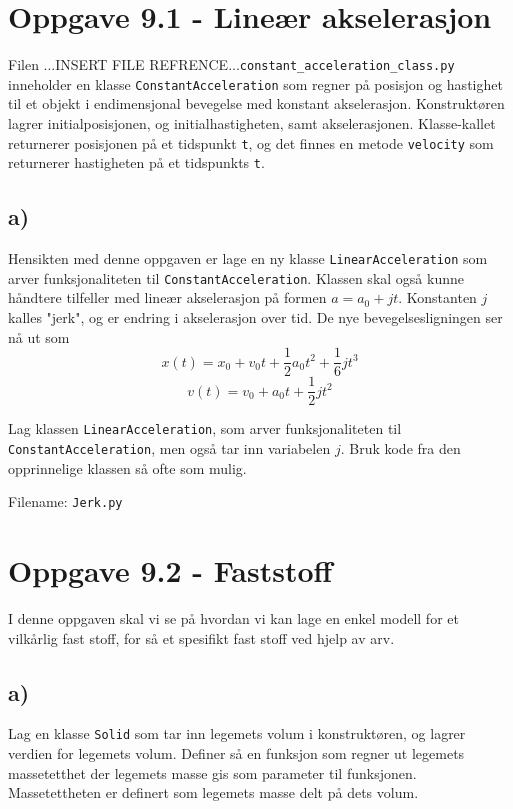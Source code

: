 \documentclass[10pt,a4paper]{article}
\newcommand{\half}{\frac{1}{2}}
\begin{document}
\section*{Oppgave 9.1 - Lineær akselerasjon}
Filen ...INSERT FILE REFRENCE...\texttt{constant\_acceleration\_class.py} inneholder en klasse \texttt{ConstantAcceleration} som regner på posisjon og hastighet til et objekt i endimensjonal bevegelse med konstant akselerasjon. Konstruktøren lagrer initialposisjonen, og initialhastigheten, samt akselerasjonen. Klasse-kallet returnerer posisjonen på et tidspunkt \texttt{t}, og det finnes en metode \texttt{velocity} som returnerer hastigheten på et tidspunkts \texttt{t}.
 
 
\subsection*{a)}
Hensikten med denne oppgaven er lage en ny klasse \texttt{LinearAcceleration} som arver funksjonaliteten til \texttt{ConstantAcceleration}. Klassen skal også kunne håndtere tilfeller med lineær akselerasjon på formen $a = a_0 + jt$. Konstanten $j$ kalles "jerk", og er endring i akselerasjon over tid. De nye bevegelsesligningen ser nå ut som
\[	x(t) = x_0 + v_0t + \half a_0t^2 + \frac{1}{6}jt^3
\]
\[	v(t) = v_0 + a_0t + \half jt^2
\]
 
Lag klassen \texttt{LinearAcceleration}, som arver funksjonaliteten til \texttt{ConstantAcceleration}, men også tar inn variabelen $j$. Bruk kode fra den opprinnelige klassen så ofte som mulig.
 
Filename: \texttt{Jerk.py}
 
\section*{Oppgave 9.2 - Faststoff}
I denne oppgaven skal vi se på hvordan vi kan lage en enkel modell for et vilkårlig fast stoff, for så et spesifikt fast stoff ved hjelp av arv.
 
\subsection*{a)}
Lag en klasse \texttt{Solid} som tar inn legemets volum i konstruktøren, og lagrer verdien for legemets volum. 
Definer så en funksjon som regner ut legemets massetetthet der legemets masse gis som parameter til funksjonen. Massetettheten er definert som legemets masse delt på dets volum.
 
\end{document}

